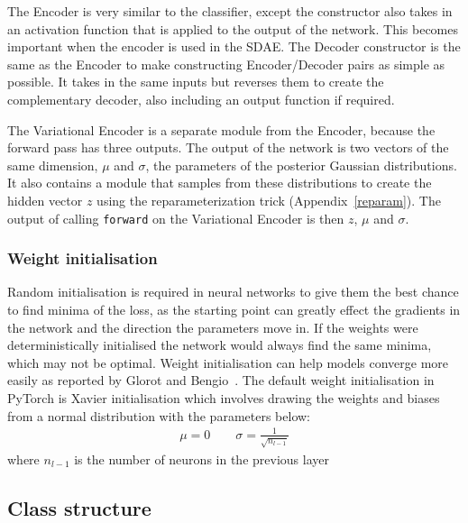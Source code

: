 \documentclass[12pt,a4paper,twoside,openright]{report}
\begin{document}
The Encoder is very similar to the classifier, except the constructor also takes in an activation function that is applied to the output 
of the network. This becomes important when the encoder is used in the SDAE. The Decoder constructor is the same as the Encoder to make 
constructing Encoder/Decoder pairs as simple as possible. It takes in the same inputs but reverses them to create the complementary decoder,
also including an output function if required.

The Variational Encoder is a separate module from the Encoder, because the forward pass has three outputs. 
The output of the network is two vectors of the same dimension, $\mu$ and $\sigma$, the parameters of the posterior Gaussian distributions.
It also contains a module that samples from these distributions to create the hidden vector $z$ using the reparameterization trick 
(Appendix~\ref{reparam}). The output of calling \texttt{forward} on the Variational Encoder is then $z$, $\mu$ and $\sigma$.

\subsubsection{Weight initialisation}
Random initialisation is required in neural networks to give them the best chance to find minima of the loss, as the starting 
point can greatly effect the gradients in the network and the direction the parameters move in. If the weights were 
deterministically initialised the network would always find the same minima, which may not be optimal.
Weight initialisation can help models converge more easily as reported by Glorot and Bengio~\cite{DBLP:journals/jmlr/GlorotB10}.
The default weight initialisation in PyTorch is Xavier initialisation which involves drawing the weights and biases from a normal 
distribution with the parameters below:
\begin{align*}
  \mu = 0 \qquad \sigma = \frac{1}{\sqrt{n_{l-1}}}
\end{align*}
where $n_{l-1}$ is the number of neurons in the previous layer

\subsection{Class structure}
\end{document}
